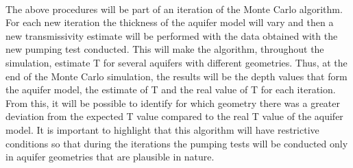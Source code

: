 \documentclass[11pt, a4paper]{article}
\begin{document}
    \paragraph{} %
    The above procedures will be part of an iteration of the Monte Carlo algorithm. For each new iteration the thickness of the aquifer model will vary and then a new transmissivity estimate will be performed with the data obtained with the new pumping test conducted. This will make the algorithm, throughout the simulation, estimate T for several aquifers with different geometries. Thus, at the end of the Monte Carlo simulation, the results will be the depth values that form the aquifer model, the estimate of T and the real value of T for each iteration. From this, it will be possible to identify for which geometry there was a greater deviation from the expected T value compared to the real T value of the aquifer model. It is important to highlight that this algorithm will have restrictive conditions so that during the iterations the pumping tests will be conducted only in aquifer geometries that are plausible in nature.
\end{document}
